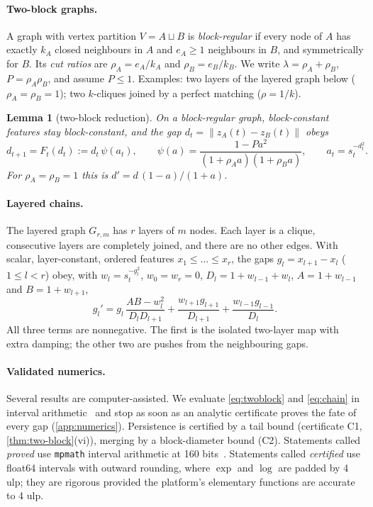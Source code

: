 \documentclass[10pt]{article}
\newtheorem{lemma}{Lemma}
\theoremstyle{definition}
\theoremstyle{remark}
\begin{document}
\paragraph{Two-block graphs.} A graph with vertex partition $V=A\sqcup B$ is \emph{block-regular} if every node of $A$ has exactly
$k_A$ closed neighbours in $A$ and $e_A\ge1$ neighbours in $B$, and symmetrically for $B$. Its \emph{cut ratios} are
$\rho_A=e_A/k_A$ and $\rho_B=e_B/k_B$. We write $\lambda=\rho_A+\rho_B$, $P=\rho_A\rho_B$, and assume $P\le1$. Examples: two
layers of the layered graph below ($\rho_A=\rho_B=1$); two $k$-cliques joined by a perfect matching ($\rho=1/k$).

\begin{lemma}[two-block reduction]\label{lem:reduction}
On a block-regular graph, block-constant features stay block-constant, and the gap $d_t=\|z_A(t)-z_B(t)\|$ obeys
\begin{equation}\label{eq:twoblock}
d_{t+1}=F_t(d_t):=d_t\,\psi(a_t),\qquad \psi(a)=\frac{1-Pa^2}{(1+\rho_Aa)(1+\rho_Ba)},\qquad a_t=s_t^{-d_t^2}.
\end{equation}
For $\rho_A=\rho_B=1$ this is $d'=d\,(1-a)/(1+a)$.
\end{lemma}

\paragraph{Layered chains.} The layered graph $G_{r,m}$ has $r$ layers of $m$ nodes. Each layer is a clique, consecutive layers are
completely joined, and there are no other edges. With scalar, layer-constant, ordered features $x_1\le\dots\le x_r$, the gaps
$g_l=x_{l+1}-x_l$ ($1\le l<r$) obey, with $w_l=s_t^{-g_l^2}$, $w_0=w_r=0$, $D_l=1+w_{l-1}+w_l$, $A=1+w_{l-1}$ and $B=1+w_{l+1}$,
\begin{equation}\label{eq:chain}
g_l'=g_l\,\frac{AB-w_l^2}{D_lD_{l+1}}+\frac{w_{l+1}g_{l+1}}{D_{l+1}}+\frac{w_{l-1}g_{l-1}}{D_l}.
\end{equation}
All three terms are nonnegative. The first is the isolated two-layer map with extra damping; the other two are pushes from the
neighbouring gaps.

\paragraph{Validated numerics.} Several results are computer-assisted. We evaluate \eqref{eq:twoblock} and \eqref{eq:chain} in
interval arithmetic~\citep{tucker2011} and stop as soon as an analytic certificate proves the fate of every gap
(\cref{app:numerics}). Persistence is certified by a tail bound (certificate C1, \cref{thm:two-block}(vi)), merging by a block-diameter
bound (C2). Statements called \emph{proved} use \texttt{mpmath} interval arithmetic at 160 bits~\citep{mpmath}. Statements called
\emph{certified} use float64 intervals with outward rounding, where $\exp$ and $\log$ are padded by 4 ulp; they are rigorous provided the
platform's elementary functions are accurate to 4 ulp.
\end{document}
